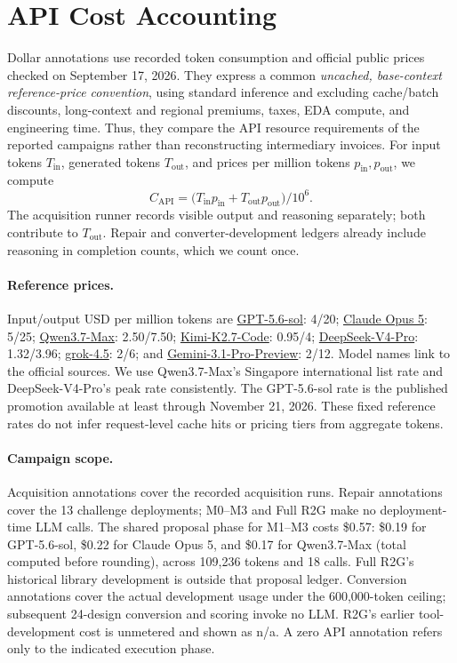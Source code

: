 \section{API Cost Accounting}
\label{app:api_costs}

Dollar annotations use recorded token consumption and official public prices checked on September 17, 2026. They express a common \emph{uncached, base-context reference-price convention}, using standard inference and excluding cache/batch discounts, long-context and regional premiums, taxes, EDA compute, and engineering time. Thus, they compare the API resource requirements of the reported campaigns rather than reconstructing intermediary invoices. For input tokens $T_{\mathrm{in}}$, generated tokens $T_{\mathrm{out}}$, and prices per million tokens $p_{\mathrm{in}},p_{\mathrm{out}}$, we compute
\[
 C_{\mathrm{API}} = \bigl(T_{\mathrm{in}}p_{\mathrm{in}} + T_{\mathrm{out}}p_{\mathrm{out}}\bigr)/10^6.
\]
The acquisition runner records visible output and reasoning separately; both contribute to $T_{\mathrm{out}}$. Repair and converter-development ledgers already include reasoning in completion counts, which we count once.

\paragraph{Reference prices.}
Input/output USD per million tokens are
\href{https://developers.openai.com/api/docs/models/gpt-5.6-sol}{GPT-5.6-sol}: 4/20;
\href{https://platform.claude.com/docs/en/models/opus-5/whats-new-opus-5}{Claude Opus 5}: 5/25;
\href{https://www.alibabacloud.com/help/en/model-studio/qwen3-7-max}{Qwen3.7-Max}: 2.50/7.50;
\href{https://platform.kimi.ai/}{Kimi-K2.7-Code}: 0.95/4;
\href{https://api-docs.deepseek.com/quick_start/pricing/}{DeepSeek-V4-Pro}: 1.32/3.96;
\href{https://docs.x.ai/developers/pricing}{grok-4.5}: 2/6; and
\href{https://ai.google.dev/gemini-api/docs/gemini-3}{Gemini-3.1-Pro-Preview}: 2/12.
Model names link to the official sources. We use Qwen3.7-Max's Singapore international list rate and DeepSeek-V4-Pro's peak rate consistently. The GPT-5.6-sol rate is the published promotion available at least through November 21, 2026. These fixed reference rates do not infer request-level cache hits or pricing tiers from aggregate tokens.

\paragraph{Campaign scope.}
Acquisition annotations cover the recorded acquisition runs. Repair annotations cover the 13 challenge deployments; M0--M3 and Full R2G make no deployment-time LLM calls. The shared proposal phase for M1--M3 costs \$0.57: \$0.19 for GPT-5.6-sol, \$0.22 for Claude Opus 5, and \$0.17 for Qwen3.7-Max (total computed before rounding), across 109,236 tokens and 18 calls. Full R2G's historical library development is outside that proposal ledger. Conversion annotations cover the actual development usage under the 600,000-token ceiling; subsequent 24-design conversion and scoring invoke no LLM. R2G's earlier tool-development cost is unmetered and shown as n/a. A zero API annotation refers only to the indicated execution phase.
